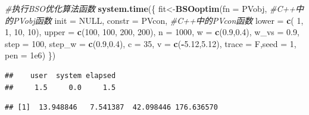 \documentclass[]{ctexbook}
\newenvironment{Shaded}{\begin{snugshade}}{\end{snugshade}}
\newcommand{\KeywordTok}[1]{\textcolor[rgb]{0.13,0.29,0.53}{\textbf{#1}}}
\newcommand{\DataTypeTok}[1]{\textcolor[rgb]{0.13,0.29,0.53}{#1}}
\newcommand{\DecValTok}[1]{\textcolor[rgb]{0.00,0.00,0.81}{#1}}
\newcommand{\FloatTok}[1]{\textcolor[rgb]{0.00,0.00,0.81}{#1}}
\newcommand{\CommentTok}[1]{\textcolor[rgb]{0.56,0.35,0.01}{\textit{#1}}}
\newcommand{\OtherTok}[1]{\textcolor[rgb]{0.56,0.35,0.01}{#1}}
\newcommand{\OperatorTok}[1]{\textcolor[rgb]{0.81,0.36,0.00}{\textbf{#1}}}
\newcommand{\NormalTok}[1]{#1}
\theoremstyle{definition}
\theoremstyle{definition}
\theoremstyle{definition}
\theoremstyle{remark}
\begin{document}
\begin{Shaded}
\begin{Highlighting}[]
\CommentTok{#执行BSO优化算法函数}
\KeywordTok{system.time}\NormalTok{(\{}
\NormalTok{  fit<-}\KeywordTok{BSOoptim}\NormalTok{(}\DataTypeTok{fn =}\NormalTok{ PVobj, }\CommentTok{#C++中的PVobj函数}
         \DataTypeTok{init =} \OtherTok{NULL}\NormalTok{,}
         \DataTypeTok{constr =}\NormalTok{ PVcon, }\CommentTok{#C++中的PVcon函数}
         \DataTypeTok{lower =} \KeywordTok{c}\NormalTok{( }\DecValTok{1}\NormalTok{, }\DecValTok{1}\NormalTok{, }\DecValTok{10}\NormalTok{, }\DecValTok{10}\NormalTok{),}
         \DataTypeTok{upper =} \KeywordTok{c}\NormalTok{(}\DecValTok{100}\NormalTok{, }\DecValTok{100}\NormalTok{, }\DecValTok{200}\NormalTok{, }\DecValTok{200}\NormalTok{),}
         \DataTypeTok{n =} \DecValTok{1000}\NormalTok{,}
         \DataTypeTok{w =} \KeywordTok{c}\NormalTok{(}\FloatTok{0.9}\NormalTok{,}\FloatTok{0.4}\NormalTok{),}
         \DataTypeTok{w_vs =} \FloatTok{0.9}\NormalTok{,}
         \DataTypeTok{step =} \DecValTok{100}\NormalTok{,}
         \DataTypeTok{step_w =} \KeywordTok{c}\NormalTok{(}\FloatTok{0.9}\NormalTok{,}\FloatTok{0.4}\NormalTok{),}
         \DataTypeTok{c =} \DecValTok{35}\NormalTok{,}
         \DataTypeTok{v =} \KeywordTok{c}\NormalTok{(}\OperatorTok{-}\FloatTok{5.12}\NormalTok{,}\FloatTok{5.12}\NormalTok{),}
         \DataTypeTok{trace =}\NormalTok{ F,}\DataTypeTok{seed =} \DecValTok{1}\NormalTok{,}
         \DataTypeTok{pen =} \FloatTok{1e6}\NormalTok{)}
\NormalTok{\})}
\end{Highlighting}
\end{Shaded}

\begin{verbatim}
##    user  system elapsed 
##     1.5     0.0     1.5
\end{verbatim}

\begin{Shaded}
\end{Shaded}

\begin{verbatim}
## [1]  13.948846   7.541387  42.098446 176.636570
\end{verbatim}

\begin{Shaded}
\end{Shaded}
\end{document}
